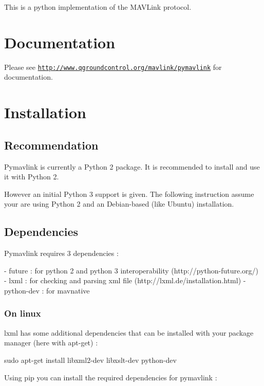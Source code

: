 This is a python implementation of the M\+A\+V\+Link protocol.

\section*{Documentation}

Please see \href{http://www.qgroundcontrol.org/mavlink/pymavlink}{\tt http\+://www.\+qgroundcontrol.\+org/mavlink/pymavlink} for documentation.

\section*{Installation}

\subsection*{Recommendation}

Pymavlink is currently a Python 2 package. It is recommended to install and use it with Python 2.

However an initial Python 3 support is given. The following instruction assume your are using Python 2 and an Debian-\/based (like Ubuntu) installation.

\subsection*{Dependencies}

Pymavlink requires 3 dependencies \+: \begin{DoxyVerb}- future : for python 2 and python 3 interoperability (http://python-future.org/)
- lxml : for checking and parsing xml file (http://lxml.de/installation.html)
- python-dev : for mavnative
\end{DoxyVerb}


\subsubsection*{On linux}

lxml has some additional dependencies that can be installed with your package manager (here with apt-\/get) \+:


\begin{DoxyCode}
sudo apt-get install libxml2-dev libxslt-dev python-dev
\end{DoxyCode}


Using pip you can install the required dependencies for pymavlink \+:



